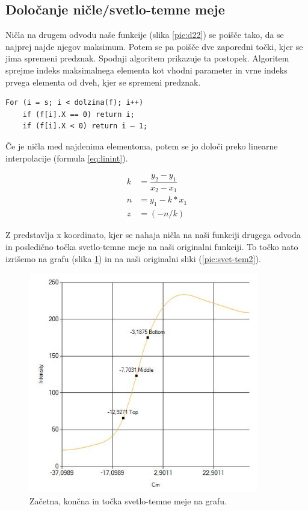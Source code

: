 \documentclass[oneside, a4paper, 12pt]{book}
\begin{document}
\subsection{Določanje ničle/svetlo-temne meje}

Ničla na drugem odvodu naše funkcije (slika \ref{pic:d22}) se poišče tako, da se najprej najde njegov maksimum. Potem  se pa poišče dve zaporedni točki, kjer se jima spremeni predznak. Spodnji algoritem prikazuje ta postopek. Algoritem sprejme indeks maksimalnega elementa kot vhodni parameter in vrne indeks prvega elementa od dveh, kjer se spremeni predznak.

\begin{verbatim}
For (i = s; i < dolzina(f); i++)
    if (f[i].X == 0) return i;
    if (f[i].X < 0) return i – 1;
\end{verbatim}

Če je ničla med najdenima elementoma, potem se jo določi preko linearne interpolacije (formula \ref{eq:linint}).

\begin{align}
k &= \dfrac{y_2-y_1}{x_2-x_1}  \nonumber\\
n &= y_1-k*x_1 \nonumber \\
z &= (-n/k) \label{eq:linint}
\end{align} 

Z predstavlja x koordinato, kjer se nahaja ničla na naši funkciji drugega odvoda in posledično točka svetlo-temne meje na naši originalni funkciji. To točko nato izrišemo na grafu (slika \ref{pic:svet-tem}) in na naši originalni sliki (\ref{pic:svet-tem2}).

\begin{figure}
\begin{center}
\includegraphics[width=10cm]{slike/svetlo-temna-meja.jpg}
\end{center}
\caption{Začetna, končna in točka svetlo-temne meje na grafu.}
\label{pic:svet-tem}
\end{figure}
\end{document}

